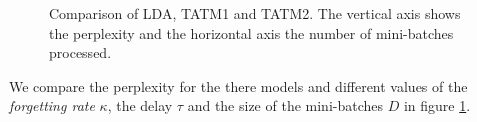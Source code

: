 \begin{figure}[ht]
{	\label{fig:kappa_tatm2}
}
\caption[Optional caption for list of figures]{Comparison of LDA, TATM1 and TATM2. The vertical axis shows the perplexity and the horizontal axis the number of mini-batches processed.}
\label{fig:evaluation}
\end{figure}
%
We compare the perplexity for the there models and different values of the \textit{forgetting rate} $\kappa$, the delay $\tau$ and the size of the mini-batches $D$ in figure \ref{fig:evaluation}.
